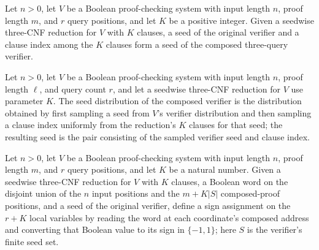 \begin{definition}
\label{FABL.composedVerifierSeed}
\leanok
{}
Let $n>0$, let $V$ be a Boolean proof-checking system with input length $n$, proof
length $m$, and $r$ query positions, and let $K$ be a positive integer. Given a seedwise
three-CNF reduction for $V$ with $K$ clauses, a seed of the original verifier and a
clause index among the $K$ clauses form a seed of the composed three-query verifier.
\end{definition}

\begin{theorem}
\label{FABL.composeThreeQueryVerifier_distribution}
\leanok
{}
Let $n>0$, let $V$ be a Boolean proof-checking system with input length $n$, proof
length $\ell$, and query count $r$, and let a seedwise three-CNF reduction for $V$ use
parameter $K$. The seed distribution of the composed verifier is the distribution
obtained by first sampling a seed from $V$'s verifier distribution and then sampling a
clause index uniformly from the reduction's $K$ clauses for that seed; the resulting
seed is the pair consisting of the sampled verifier seed and clause index.
\end{theorem}

\begin{definition}
\label{FABL.compositionLocalAssignment}
\leanok
{}
Let $n>0$, let $V$ be a Boolean proof-checking system with input length $n$, proof
length $m$, and $r$ query positions, and let $K$ be a natural number. Given a seedwise
three-CNF reduction for $V$ with $K$ clauses, a Boolean word on the disjoint union of
the $n$ input positions and the $m+K|S|$ composed-proof positions, and a seed of the
original verifier, define a sign assignment on the $r+K$ local variables by reading the
word at each coordinate’s composed address and converting that Boolean value to its sign
in $\{ -1,1\}$; here $S$ is the verifier’s finite seed set.
\end{definition}

